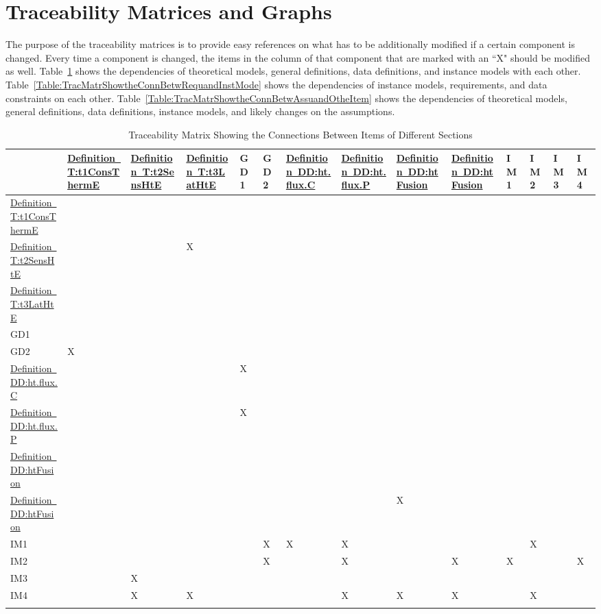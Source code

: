\documentclass[12pt]{article}
\begin{document}
\section{Traceability Matrices and Graphs}
\label{Sec:TracMatrandGrap}
The purpose of the traceability matrices is to provide easy references on what has to be additionally modified if a certain component is changed. Every time a component is changed, the items in the column of that component that are marked with an ``X" should be modified as well. Table~\ref{Table:TracMatrShowtheConnBetwItemofDiffSect} shows the dependencies of theoretical models, general definitions, data definitions, and instance models with each other. Table~\ref{Table:TracMatrShowtheConnBetwRequandInstMode} shows the dependencies of instance models, requirements, and data constraints on each other. Table~\ref{Table:TracMatrShowtheConnBetwAssuandOtheItem} shows the dependencies of theoretical models, general definitions, data definitions, instance models, and likely changes on the assumptions.
\begin{longtable}{l l l l l l l l l l l l l l}
\toprule
 & \hyperref[T:t1ConsThermE]{Definition~T:t1ConsThermE} & \hyperref[T:t2SensHtE]{Definition~T:t2SensHtE} & \hyperref[T:t3LatHtE]{Definition~T:t3LatHtE} & GD1 & GD2 & \hyperref[DD:ht.flux.C]{Definition~DD:ht.flux.C} & \hyperref[DD:ht.flux.P]{Definition~DD:ht.flux.P} & \hyperref[DD:htFusion]{Definition~DD:htFusion} & \hyperref[DD:htFusion]{Definition~DD:htFusion} & IM1 & IM2 & IM3 & IM4
\\
\midrule
\hyperref[T:t1ConsThermE]{Definition~T:t1ConsThermE} &  &  &  &  &  &  &  &  &  &  &  &  & 
\\
\hyperref[T:t2SensHtE]{Definition~T:t2SensHtE} &  &  & X &  &  &  &  &  &  &  &  &  & 
\\
\hyperref[T:t3LatHtE]{Definition~T:t3LatHtE} &  &  &  &  &  &  &  &  &  &  &  &  & 
\\
GD1 &  &  &  &  &  &  &  &  &  &  &  &  & 
\\
GD2 & X &  &  &  &  &  &  &  &  &  &  &  & 
\\
\hyperref[DD:ht.flux.C]{Definition~DD:ht.flux.C} &  &  &  & X &  &  &  &  &  &  &  &  & 
\\
\hyperref[DD:ht.flux.P]{Definition~DD:ht.flux.P} &  &  &  & X &  &  &  &  &  &  &  &  & 
\\
\hyperref[DD:htFusion]{Definition~DD:htFusion} &  &  &  &  &  &  &  &  &  &  &  &  & 
\\
\hyperref[DD:htFusion]{Definition~DD:htFusion} &  &  &  &  &  &  &  & X &  &  &  &  & 
\\
IM1 &  &  &  &  & X & X & X &  &  &  & X &  & 
\\
IM2 &  &  &  &  & X &  & X &  & X & X &  &  & X
\\
IM3 &  & X &  &  &  &  &  &  &  &  &  &  & 
\\
IM4 &  & X & X &  &  &  & X & X & X &  & X &  & 
\\
\bottomrule
\caption{Traceability Matrix Showing the Connections Between Items of Different Sections}
\label{Table:TracMatrShowtheConnBetwItemofDiffSect}
\end{longtable}
\end{document}
